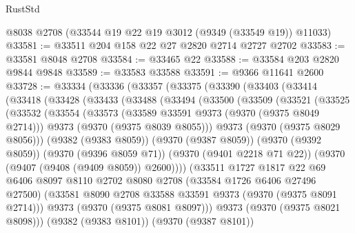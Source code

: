 \begin{lexlean}{RustStd}
\begin{coremodule}
    @8038
    @2708
    (@33544 @19 @22 @19 @3012 (@9349 (@33549 @19)) @11033)
@33581 := @33511 @204 @158 @22 @27 @2820 @2714 @2727 @2702
@33583 := @33581 @8048 @2708
@33584 := @33465 @22
@33588 := @33584 @203 @2820 @9844 @9848
@33589 := @33583 @33588
@33591 := @9366 @11641 @2600
@33728 := @33334
    (@33336
      (@33357
        (@33375
          (@33390
            (@33403
              (@33414
                (@33418
                  (@33428
                    (@33433
                      (@33488
                        (@33494
                          (@33500
                            (@33509
                              (@33521
                                (@33525
                                  (@33532
                                    (@33554
                                      (@33573
                                        (@33589 @33591 @9373 (@9370 (@9375 @8049 @2714)))
                                        @9373
                                        (@9370 (@9375 @8039 @8055)))
                                      @9373
                                      (@9370 (@9375 @8029 @8056)))
                                    (@9382 (@9383 @8059))
                                    (@9370 (@9387 @8059))
                                    (@9370 (@9392 @8059))
                                    (@9370 (@9396 @8059 @71))
                                    (@9370 (@9401 @2218 @71 @22))
                                    (@9370 (@9407 (@9408 (@9409 @8059)) @2600))))
                                (@33511
                                  @1727
                                  @1817
                                  @22
                                  @69
                                  @6406
                                  @8097
                                  @8110
                                  @2702
                                  @8080
                                  @2708
                                  (@33584 @1726 @6406 @27496 @27500)
                                  (@33581
                                    @8090
                                    @2708
                                    @33588
                                    @33591
                                    @9373
                                    (@9370 (@9375 @8091 @2714)))
                                  @9373
                                  (@9370 (@9375 @8081 @8097)))
                                @9373
                                (@9370 (@9375 @8021 @8098)))
                              (@9382 (@9383 @8101))
                              (@9370 (@9387 @8101))

\end{coremodule}
\end{lexlean}
